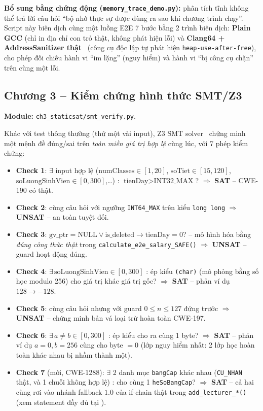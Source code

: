 \textbf{Bổ sung bằng chứng động (\texttt{memory\_trace\_demo.py}):} phân tích tĩnh không thể trả lời câu hỏi ``bộ nhớ thực sự được dùng ra sao khi chương trình chạy''. Script này biên dịch cùng một luồng E2E 7 bước bằng 2 trình biên dịch: \textbf{Plain GCC} (chỉ in địa chỉ con trỏ thật, không phát hiện lỗi) và \textbf{Clang64 + AddressSanitizer thật}~\cite{clangasan} (công cụ độc lập tự phát hiện \texttt{heap-use-after-free}), cho phép đối chiếu hành vi ``im lặng'' (nguy hiểm) và hành vi ``bị công cụ chặn'' trên cùng một lỗi.

\subsection{Chương 3 -- Kiểm chứng hình thức SMT/Z3}
\label{sec:ch3}

\textbf{Module:} \texttt{ch3\_staticsat/smt\_verify.py}.

Khác với test thông thường (thử một vài input), Z3 SMT solver~\cite{demoura2008z3} chứng minh một mệnh đề đúng/sai trên \emph{toàn miền giá trị hợp lệ} cùng lúc, với 7 phép kiểm chứng:

\begin{itemize}
  \item \textbf{Check 1}: $\exists$ input hợp lệ ($\text{numClasses}\in[1,20]$, $\text{soTiet}\in[15,120]$, $\text{soLuongSinhVien}\in[0,300]$,\dots) : $\text{tienDay} > \text{INT32\_MAX}$? $\Rightarrow$ \textbf{SAT} -- CWE-190 có thật.
  \item \textbf{Check 2}: cùng câu hỏi với ngưỡng \texttt{INT64\_MAX} trên kiểu \texttt{long long} $\Rightarrow$ \textbf{UNSAT} -- an toàn tuyệt đối.
  \item \textbf{Check 3}: $\text{gv\_ptr} = \text{NULL} \lor \text{is\_deleted} \to \text{tienDay} = 0$? -- mô hình hóa bằng \emph{đúng công thức thật} trong \texttt{calculate\_e2e\_salary\_SAFE()} $\Rightarrow$ \textbf{UNSAT} -- guard hoạt động đúng.
  \item \textbf{Check 4}: $\exists\, \text{soLuongSinhVien}\in[0,300]$ : ép kiểu \texttt{(char)} (mô phỏng bằng số học modulo 256) cho giá trị khác giá trị gốc? $\Rightarrow$ \textbf{SAT} -- phản ví dụ $128 \to -128$.
  \item \textbf{Check 5}: cùng câu hỏi nhưng với guard $0 \le n \le 127$ đứng trước $\Rightarrow$ \textbf{UNSAT} -- chứng minh bản vá loại trừ hoàn toàn CWE-197.
  \item \textbf{Check 6}: $\exists\, a \ne b \in [0,300]$ : ép kiểu cho ra cùng 1 byte? $\Rightarrow$ \textbf{SAT} -- phản ví dụ $a=0, b=256$ cùng cho byte $=0$ (lớp nguy hiểm nhất: 2 lớp học hoàn toàn khác nhau bị nhầm thành một).
  \item \textbf{Check 7} (mới, CWE-1288): $\exists$ 2 danh mục \texttt{bangCap} khác nhau (\texttt{CU\_NHAN} thật, và 1 chuỗi không hợp lệ) : cho cùng 1 \texttt{heSoBangCap}? $\Rightarrow$ \textbf{SAT} -- cả hai cùng rơi vào nhánh fallback $1.0$ của if-chain thật trong \texttt{add\_lecturer\_*()} (xem statement đầy đủ tại ).
\end{itemize}

